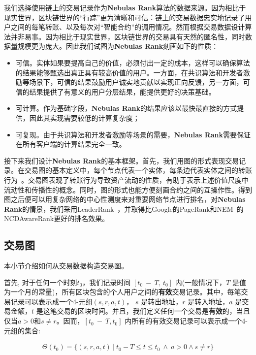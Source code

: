 我们选择使用链上的交易记录作为\textbf{Nebulas Rank}算法的数据来源。因为相比于现实世界，区块链世界的“行踪”更为清晰和可信：链上的交易数据忠实地记录了用户之间的每笔转账、以及每次对“智能合约”的调用情况。然而根据交易数据设计算法并非易事。因为相比于现实世界，区块链世界的交易具有天然的匿名性，同时数据量规模更为庞大。因此我们试图为\textbf{Nebulas Rank}刻画如下的性质：
\begin{itemize}
	\item 可信。实体如果要提高自己的价值，必须付出一定的成本，这样可以确保算法的结果能够甄选出真正具有较高价值的用户。一方面，在共识算法和开发者激励等场景下，可信的结果鼓励用户诚实地贡献以实现正向反馈，另一方面，可信的结果提供了有意义的用户分层结果，能提供更好的决策基础。
	\item 可计算。作为基础字段，\textbf{Nebulas Rank}的结果应该以最快最直接的方式提供，因此其实现需要较低的计算复杂度；
	\item 可复现。由于共识算法和开发者激励等场景的需要，\textbf{Nebulas Rank}需要保证在所有客户端的计算结果完全一致。
\end{itemize}

接下来我们设计\textbf{Nebulas Rank}的基本框架。首先，我们用图的形式表现交易记录。在交易图的基本定义中，每个节点代表一个实体，每条边代表实体之间的转账行为~\cite{Tschorsch2015}。交易图表现了转账行为导致资产流动的性质，有助于表示上述价值尺度中流动性和传播性的概念。同时，图的形式也能方便刻画合约之间的互操作性。得到图之后便可以用复杂网络的中心性测度来对重要网络节点进行排名，对\textbf{Nebulas Rank}的情景，我们采用LeaderRank~\cite{Chen2013}\cite{Li2014}，并取得比Google的PageRank和NEM~\cite{nem}的NCDAwareRank更好的排名效果。

\subsection{交易图} \label{subsec:txg}
本小节介绍如何从交易数据构造交易图。

首先, 对于任何一个时刻$t_0$，我们记录时间 $[t_0\ −\ T,\ t_0]$ 内(一般情况下，$T$ 是值为一个月的常量)，所有区块包含的个人用户之间的\textbf{有效}交易记录。其中，每笔交易记录可以表示成一个4-元组$(s,r,a,t)$， $s$ 是转出地址，$r$ 是转入地址，$a$ 是交易金额，$t$ 是这笔交易的区块时间。并且，我们定义任何一个交易是\textbf{有效}的，当且仅当$a > 0$和$s \neq r$。因而，$[t_0\ −\ T, t_0]$ 内所有的有效交易记录可以表示成一个4-元组的集合:

\begin{align}
\Theta(t_0) = \{(s, r, a, t)\ |\ t_0 - T \le t \le t_0\ \land \ a > 0 \land s \neq r \}
\end{align}

